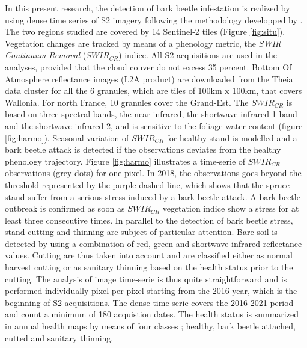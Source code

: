\documentclass[3p,procedia]{elsarticle}
\begin{document}
In this present research, the detection of bark beetle infestation is realized by using dense time series of S2 imagery following the methodology developped by \cite{dutrieux_package_2021}.
The two regions  studied are covered by 14 Sentinel-2 tiles (Figure \ref{fig:situ}).  
Vegetation changes are tracked by means of a phenology metric, the \textit{SWIR Continuum Removal} ($SWIR_{CR}$) indice.
All S2 acquisitions are used in the analyses, provided that the cloud couver do not excess 35 percent. 
Bottom Of Atmosphere reflectance images (L2A product) are downloaded from the Theia data cluster \citep{theia_team} for all the 6 granules, which are tiles of 100km x 100km, that covers Wallonia. 
For north France, 10 granules cover the Grand-Est.
The $SWIR_{CR}$ is based on three spectral bands, the near-infrared, the shortwave infrared 1 band and the shortwave infrared 2, and is sensitive to the foliage water content (figure \ref{fig:harmo}).
Seasonal variation of $SWIR_{CR}$ for healthy stand is modelled and a bark beetle attack is detected if the observations deviates from the healthy phenology trajectory. 
Figure \ref{fig:harmo} illustrates a time-serie of $SWIR_{CR}$ observations (grey dots) for one pixel. 
In 2018, the observations goes beyond the threshold represented by the purple-dashed line, which shows that the spruce stand suffer from a serious stress induced by a bark beetle attack.
A bark beetle outbreak is confirmed as soon as $SWIR_{CR}$ vegetation indice show a stress for at least three consecutive times.
In parallel to the detection of bark beetle stress, stand cutting and thinning are subject of particular attention. 
Bare soil is detected by using a combination of red, green and shortwave infrared reflectance values.
Cutting are thus taken into account and are classified either as normal harvest cutting or as sanitary thinning based on the health status prior to the cutting.
The analysis of image time-serie is thus quite straightforward and is performed individually pixel per pixel starting from the 2016 year, which is the beginning of S2 acquisitions. 
The dense time-serie covers the 2016-2021 period and count a minimum of 180 acquistion dates. 
The health status is summarized in annual health maps by means of four classes ; healthy, bark beetle attached, cutted and sanitary thinning.
\end{document}
